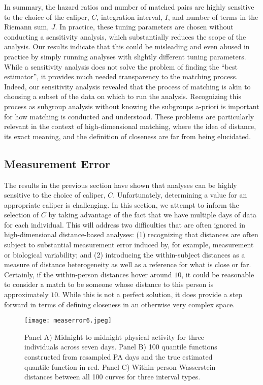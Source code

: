 In summary, the hazard ratios and number of matched pairs are highly sensitive to the choice of the caliper, $C$, integration interval, $I$, and number of terms in the Riemann sum, $J$. In practice, these tuning parameters are chosen without conducting a sensitivity analysis, which substantially reduces the scope of the analysis. Our results indicate that this could be misleading and even abused in practice by simply running analyses with slightly different tuning parameters. While a sensitivity analysis does not solve the problem of finding the ``best estimator'', it provides much needed transparency to the matching process. Indeed, our sensitivity analysis revealed that the process of matching is akin to choosing a subset of the data on which to run the analysis. Recognizing this process as subgroup analysis without knowing the subgroups a-priori is important for how matching is conducted and understood. These problems are particularly relevant in the context of high-dimensional matching, where the idea of distance, its exact meaning, and the definition of closeness are far from being elucidated. 

\subsection{Measurement Error}\label{subsec:meas_error}
The results in the previous section have shown that analyses can be highly sensitive to the choice of caliper, $C$. Unfortunately, determining a value for an appropriate caliper is challenging. In this section, we attempt to inform the selection of $C$ by taking advantage of the fact that we have multiple days of data for each individual. This will address two difficulties that are often ignored in high-dimensional distance-based analyses: (1) recognizing that distances are often subject to substantial measurement error induced by, for example, measurement or biological variability; and (2) introducing the within-subject distances as a measure of distance heterogeneity as well as a reference for what is close or far. Certainly, if the within-person distances hover around $10$, it could be reasonable to consider a match to be someone whose distance to this person is approximately $10$. While this is not a perfect solution, it does provide a step forward in terms of defining closeness in an otherwise very complex space.




\begin{figure}[H]
    \centering
    \texttt{[image: measerror6.jpeg]}
    \caption{Panel A) Midnight to midnight physical activity for three individuals across seven days. Panel B) 100 quantile functions constructed from resampled PA days and the true estimated quantile function in red. Panel C) Within-person Wasserstein distances between all 100 curves for three interval types.}
    \label{fig:meas}
\end{figure}

